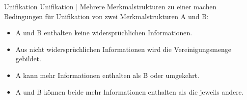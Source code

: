 \begin{frame}
  {Unifikation}
  \onslide<+->
  \onslide<+->
  \alert{Unifikation} | Mehrere Merkmalstrukturen \alert{zu einer machen}\\
  Bedingungen für Unifikation von zwei Merkmalstrukturen A und B:\\
  \Zeile
  \begin{itemize}[<+->]
    \item A und B enthalten \alert{keine widersprüchlichen Informationen}.\\
      \Viertelzeile
      \onslide<+->
      \grau{%
        \scalebox{0.8}{\begin{avm}
          \[ cas & nom \]
        \end{avm}} \raisebox{-0.15\baselineskip}{und} %
        \scalebox{0.8}{\begin{avm}
          \[ cas & acc \]
        \end{avm}} \raisebox{-0.15\baselineskip}{unifizieren nicht.}}
      \Halbzeile
    \item Aus nicht widersprüchlichen Informationen wird die \alert{Vereinigungsmenge} gebildet.
      \Halbzeile
    \item A kann mehr Informationen enthalten als B oder umgekehrt.\\
      \Viertelzeile
      \onslide<+->
      \grau{%
        \scalebox{0.8}{\begin{avm}
          \[ cas & nom \\ per & 3 \]
        \end{avm}} \raisebox{-0.5\baselineskip}{und} %
        \raisebox{-0.4\baselineskip}{\scalebox{0.8}{\begin{avm}
          \[ cas & nom \]
        \end{avm}}} \raisebox{-0.5\baselineskip}{unifizieren zu} %
        \scalebox{0.8}{\begin{avm}
          \[ cas & nom \\ per & 3 \]
        \end{avm}}}
      \Halbzeile
    \item A und B können beide mehr Informationen enthalten als die jeweils andere.\\
      \Viertelzeile
      \onslide<+->
      \grau{%
        \raisebox{-0.5\baselineskip}{\scalebox{0.8}{\begin{avm}
          \[ cas & nom \\ per & 3 \]
        \end{avm}}} \raisebox{-1\baselineskip}{und} %
        \raisebox{-0.5\baselineskip}{\scalebox{0.8}{\begin{avm}
          \[ cas & nom \\ num & sg \]
        \end{avm}}} \raisebox{-1\baselineskip}{unifizieren zu} %
        \scalebox{0.8}{\begin{avm}
          \[ cas & nom \\ per & 3 \\ num & sg \]
        \end{avm}}}
  \end{itemize}
\end{frame}

